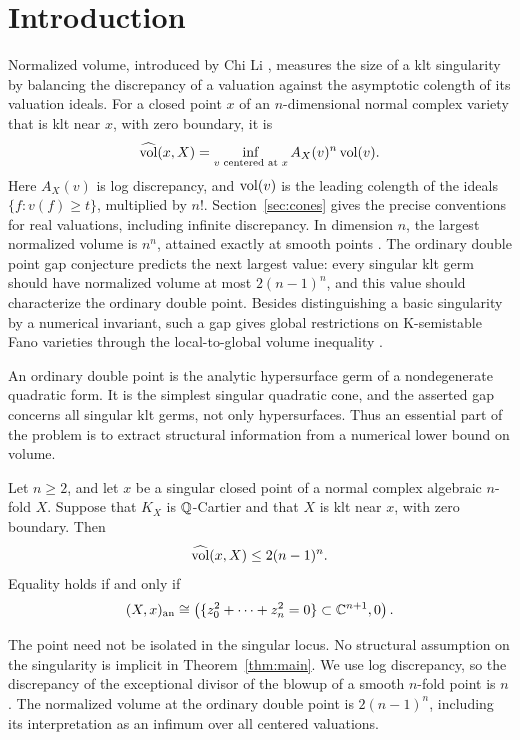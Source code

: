\section{Introduction}\label{sec:introduction}

Normalized volume, introduced by Chi Li \cite{Li18}, measures the
size of a klt singularity by balancing
the discrepancy of a valuation against the asymptotic colength of its
valuation ideals. For a closed point \(x\) of an \(n\)-dimensional
normal complex variety that is klt near \(x\), with zero boundary,
it is
\[
 \widehat{\operatorname{vol}}(x,X)=\inf_{v\text{ centered at }x} A_X(v)^n\operatorname{vol}(v).
\]
Here \(A_X(v)\) is log discrepancy, and \(\operatorname{vol}(v)\) is the
leading colength of the ideals \(\{f:v(f)\ge t\}\), multiplied by
\(n!\). Section~\ref{sec:cones} gives the precise conventions for
real valuations, including infinite discrepancy. In dimension \(n\),
the largest normalized volume is \(n^n\),
attained exactly at smooth points \cite[Theorem~1.6]{LX19}.
The ordinary double point gap conjecture predicts the next largest
value: every singular klt germ should have normalized volume at most
\(2(n-1)^n\), and this value should characterize the ordinary double
point. Besides distinguishing a basic singularity by a numerical
invariant, such a gap gives global restrictions on K-semistable Fano
varieties through the local-to-global volume inequality
\cite[Theorem~21]{Liu18}.

An ordinary double point is the analytic hypersurface germ of a
nondegenerate quadratic form. It is the simplest singular quadratic
cone, and the asserted gap concerns all singular klt germs, not only
hypersurfaces. Thus an essential part of the problem is to extract
structural information from a numerical lower bound on volume.

\begin{theorem}\label{thm:main}
Let \(n\ge2\), and let \(x\) be a
singular closed point of a normal complex algebraic \(n\)-fold \(X\).
Suppose that \(K_X\) is \(\mathbb Q\)-Cartier and that \(X\) is klt near \(x\),
with zero boundary. Then
\[
                    \widehat{\operatorname{vol}}(x,X)\le2(n-1)^n.
\]
Equality holds if and only if
\[
 (X,x)_{\mathrm{an}}\cong
 \left(\{z_0^2+\cdots+z_n^2=0\}\subset\mathbb C^{n+1},0\right).
\]
\end{theorem}

The point need not be isolated in the singular locus. No structural
assumption on the singularity is implicit in Theorem~\ref{thm:main}.
We use log discrepancy, so the discrepancy of the exceptional divisor
of the blowup of a smooth \(n\)-fold point is \(n\). The normalized
volume at the ordinary double point is \(2(n-1)^n\), including its
interpretation as an infimum over all centered valuations.

